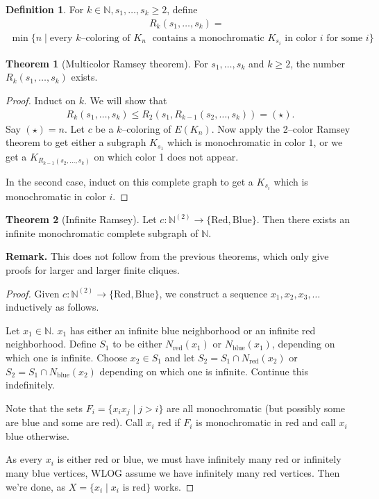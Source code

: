 \documentclass{article}
\theoremstyle{definition}
\newtheorem{theorem}{Theorem}[section]
\newtheorem{defn}{Definition}[section]
\begin{document}
\begin{defn}
    For $k \in \mathbb{N}, s_1,\ldots,s_k \ge 2$, define 
    \begin{align*}
        &R_k(s_1,\ldots,s_k) = \\
        \min \{n \mid \text{every }k \text{--coloring of }K_n &\text{ contains a monochromatic }K_{s_i} \text{ in color }i \text{ for some }i\}
    \end{align*}
\end{defn}
\begin{theorem}[Multicolor Ramsey theorem]
    For $s_1,\ldots,s_k$ and $k\ge 2$, the number $R_k(s_1,\ldots,s_k)$ exists.
\end{theorem}
\begin{proof}
    Induct on $k$. We will show that
    \begin{align*}
        R_k(s_1,\ldots,s_k) \le R_2(s_1,R_{k-1}(s_2,\ldots,s_k)) = (\star).
    \end{align*}
    Say $(\star)=n$. Let $c$ be a $k$--coloring of $E(K_n)$. Now apply the 2--color Ramsey theorem to get either a subgraph $K_{s_1}$ which is monochromatic in color $1$, or we get a $K_{R_{k-1}(s_2,\ldots,s_k)}$ on which color 1 does not appear. 

    In the second case, induct on this complete graph to get a $K_{s_i}$ which is monochromatic in color $i$.
\end{proof}

\begin{theorem}[Infinite Ramsey]
    Let $c : \mathbb{N}^{(2)} \to \{\text{Red},\text{Blue}\}$. Then there exists an infinite monochromatic complete subgraph of $\mathbb{N}$.
\end{theorem}
\textbf{Remark.} This does not follow from the previous theorems, which only give proofs for larger and larger finite cliques.
\begin{proof}
    Given $c : \mathbb{N}^{(2)} \to \{\text{Red},\text{Blue}\}$, we construct a sequence $x_1,x_2,x_3,\ldots$ inductively as follows.
    \vspace{1mm}
    
    Let $x_1 \in \mathbb{N}$. $x_1$ has either an infinite blue neighborhood or an infinite red neighborhood. Define $S_1$ to be either $N_{\text{red}}(x_1)$ or $N_{\text{blue}}(x_1)$, depending on which one is infinite. Choose $x_2 \in S_1$ and let $S_2 = S_1 \cap N_{\text{red}}(x_2)$ or $S_2= S_1 \cap N_{\text{blue}}(x_2)$ depending on which one is infinite. Continue this indefinitely.
    \vspace{1mm}
    
    Note that the sets $F_i = \{x_ix_j \mid j > i\}$ are all monochromatic (but possibly some are blue and some are red). Call $x_i$ red if $F_i$ is monochromatic in red and call $x_i$ blue otherwise.

    As every $x_i$ is either red or blue, we must have infinitely many red or infinitely many blue vertices, WLOG assume we have infinitely many red vertices. Then we're done, as $X= \{x_i \mid x_i \text{ is red}\}$ works.
\end{proof}
\end{document}
